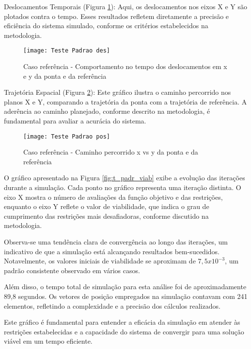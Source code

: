 Deslocamentos Temporais (Figura \ref{fig:t_padr_des}): Aqui, os deslocamentos nos eixos X e Y são plotados contra o tempo. Esses resultados refletem diretamente a precisão e eficiência do sistema simulado, conforme os critérios estabelecidos na metodologia.

\begin{figure}[H]
    \begin{center}
    \caption{Caso referência - Comportamento no tempo dos deslocamentos em x e y da ponta e da referência}
    \texttt{[image: Teste Padrao des]}
    \label{fig:t_padr_des}
    \end{center}
\end{figure}    

Trajetória Espacial (Figura \ref{fig:t_padr_pos}): Este gráfico ilustra o caminho percorrido nos planos X e Y, comparando a trajetória da ponta com a trajetória de referência. A aderência ao caminho planejado, conforme descrito na metodologia, é fundamental para avaliar a acurácia do sistema.

\begin{figure}[H]
    \begin{center}
    \caption{Caso referência - Caminho percorrido x vs y da ponta e da referência}
    \texttt{[image: Teste Padrao pos]}
    \label{fig:t_padr_pos}
    \end{center}
\end{figure}

O gráfico apresentado na Figura \ref{fig:t_padr_viab} exibe a evolução das iterações durante a simulação. Cada ponto no gráfico representa uma iteração distinta. O eixo X mostra o número de avaliações da função objetivo e das restrições, enquanto o eixo Y reflete o valor de viabilidade, que indica o grau de cumprimento das restrições mais desafiadoras, conforme discutido na metodologia.

Observa-se uma tendência clara de convergência ao longo das iterações, um indicativo de que a simulação está alcançando resultados bem-sucedidos. Notavelmente, os valores iniciais de viabilidade se aproximam de $7,5x10^{-3}$, um padrão consistente observado em vários casos.

Além disso, o tempo total de simulação para esta análise foi de aproximadamente 89,8 segundos. Os vetores de posição empregados na simulação contavam com 241 elementos, refletindo a complexidade e a precisão dos cálculos realizados.

Este gráfico é fundamental para entender a eficácia da simulação em atender às restrições estabelecidas e a capacidade do sistema de convergir para uma solução viável em um tempo eficiente.

